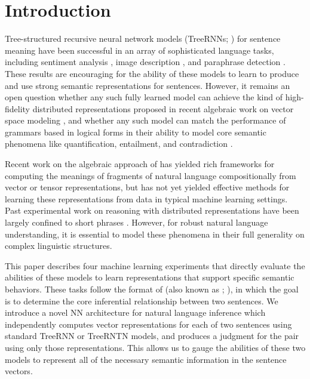 \section{Introduction}\label{sec:intro}

Tree-structured recursive neural network models (TreeRNNs; \citealt{goller1996learning}) for sentence meaning
have been successful in an array of sophisticated language tasks,
including sentiment analysis \cite{socher2011semi,irsoydeep},
image description \cite{sochergrounded}, and paraphrase detection
\cite{Socher-etal:2011:Paraphrase}. These results are encouraging for
the ability of these models to learn to produce and use strong 
semantic representations for sentences. However, it remains an 
open question whether any such fully learned model can achieve the kind of
high-fidelity distributed representations proposed in recent algebraic
work on vector space modeling 
\cite{ClarkCoeckeSadrzadeh2011,grefenstette2013towards,Hermann-etal:2013,rocktaschellow},
and whether any such model can match the performance of grammars based in logical forms
in their ability to model core semantic phenomena like quantification, entailment, and contradiction \cite{Warren:Pereira:1982,Zelle:Mooney:1996,ZetCol:2005,LiangJordan:2013}.

Recent work on the algebraic approach of
 has yielded rich frameworks 
for computing the meanings of fragments of natural
language compositionally from vector or tensor representations, but 
has not yet yielded effective methods for learning these representations
from data in typical machine learning settings. 
Past experimental work on reasoning with
distributed representations have been largely confined to short
phrases \cite{Mitchell:Lapata:2010,Grefenstette-etal:2011,baroni2012entailment}.
However, for robust natural language understanding, it is essential to
model these phenomena in their full generality on complex linguistic
structures. 

This paper describes four machine learning experiments
that directly evaluate the abilities of these models to learn representations that 
support specific semantic behaviors. These tasks follow the format of
(also known as ;
\citealt{dagan2006pascal}), in which the goal is to determine the core
inferential relationship between two sentences. 
We introduce a novel NN architecture for natural language inference which
independently computes vector representations for each of two sentences using
standard TreeRNN or TreeRNTN \cite{socher2013acl1} models, and
produces a judgment for the pair using only those representations. This allows
us to gauge the abilities of these two models to represent all of the necessary semantic
information in the sentence vectors. 

